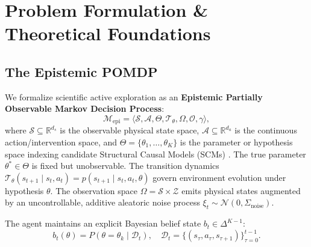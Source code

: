 \section{Problem Formulation \& Theoretical Foundations}
\label{sec:theory}

\subsection{The Epistemic POMDP}
We formalize scientific active exploration as an \textbf{Epistemic Partially Observable Markov Decision Process}:
\begin{equation}
    \mathcal{M}_{\text{epi}} = \langle \mathcal{S}, \mathcal{A}, \Theta, \mathcal{T}_\theta, \Omega, \mathcal{O}, \gamma \rangle,
\end{equation}
where $\mathcal{S} \subseteq \mathbb{R}^{d_s}$ is the observable physical state space, $\mathcal{A} \subseteq \mathbb{R}^{d_a}$ is the continuous action/intervention space, and $\Theta = \{\theta_1, \dots, \theta_K\}$ is the parameter or hypothesis space indexing candidate Structural Causal Models (SCMs) \citep{pearl2009causality}. The true parameter $\theta^* \in \Theta$ is fixed but unobservable. The transition dynamics $\mathcal{T}_\theta(s_{t+1} \mid s_t, a_t) = p(s_{t+1} \mid s_t, a_t, \theta)$ govern environment evolution under hypothesis $\theta$. The observation space $\Omega = \mathcal{S} \times \mathcal{Z}$ emits physical states augmented by an uncontrollable, additive aleatoric noise process $\xi_t \sim \mathcal{N}(0, \Sigma_{\text{noise}})$.

The agent maintains an explicit Bayesian belief state $b_t \in \Delta^{K-1}$:
\begin{equation}
    b_t(\theta) = P(\theta = \theta_k \mid \mathcal{D}_t), \quad \mathcal{D}_t = \{(s_\tau, a_\tau, s_{\tau+1})\}_{\tau=0}^{t-1}.
\end{equation}

